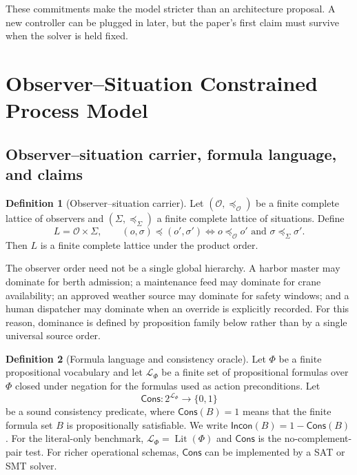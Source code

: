 \documentclass[11pt]{article}
\newcommand{\Lit}{\operatorname{Lit}}
\newcommand{\Lang}{\mathcal L}
\newcommand{\Cons}{\mathsf{Cons}}
\newcommand{\Incon}{\mathsf{Incon}}
\newcommand{\1}{\mathbf{1}}
\theoremstyle{definition}
\newtheorem{definition}{Definition}[section]
\theoremstyle{plain}
\theoremstyle{remark}
\begin{document}
These commitments make the model stricter than an architecture proposal. A new controller can be plugged in later, but the paper's first claim must survive when the solver is held fixed.

\section{Observer--Situation Constrained Process Model}
\label{sec:model}

\subsection{Observer--situation carrier, formula language, and claims}

\begin{definition}[Observer--situation carrier]
\label{def:carrier}
Let $(\mathcal O,\preceq_{\mathcal O})$ be a finite complete lattice of observers and $(\Sigma,\preceq_{\Sigma})$ a finite complete lattice of situations. Define
\[
L=\mathcal O\times \Sigma,
\qquad
(o,\sigma)\preceq (o',\sigma')
\Longleftrightarrow
 o\preceq_{\mathcal O}o' \text{ and } \sigma\preceq_{\Sigma}\sigma'.
\]
Then $L$ is a finite complete lattice under the product order.
\end{definition}

The observer order need not be a single global hierarchy. A harbor master may dominate for berth admission; a maintenance feed may dominate for crane availability; an approved weather source may dominate for safety windows; and a human dispatcher may dominate when an override is explicitly recorded. For this reason, dominance is defined by proposition family below rather than by a single universal source order.

\begin{definition}[Formula language and consistency oracle]
\label{def:language}
Let $\Phi$ be a finite propositional vocabulary and let $\Lang_\Phi$ be a finite set of propositional formulas over $\Phi$ closed under negation for the formulas used as action preconditions. Let
\[
\Cons:2^{\Lang_\Phi}\to\{0,1\}
\]
be a sound consistency predicate, where $\Cons(B)=1$ means that the finite formula set $B$ is propositionally satisfiable. We write $\Incon(B)=1-\Cons(B)$. For the literal-only benchmark, $\Lang_\Phi=\Lit(\Phi)$ and $\Cons$ is the no-complement-pair test. For richer operational schemas, $\Cons$ can be implemented by a SAT or SMT solver.
\end{definition}
\end{document}
